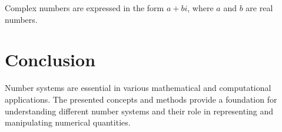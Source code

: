 \documentclass{article}
\begin{document}
Complex numbers are expressed in the form $a + bi$, where $a$ and $b$ are real numbers.

\section{Conclusion}

Number systems are essential in various mathematical and computational applications. The presented concepts and methods provide a foundation for understanding different number systems and their role in representing and manipulating numerical quantities.
\end{document}
